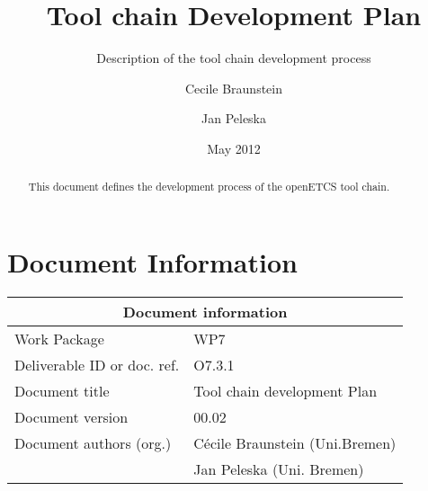 \documentclass{openetcs_article}
\begin{document}
\frontmatter
{}




\title{Tool chain Development Plan}

\subtitle{Description of the tool chain development process}

\date{May 2012}


\author{Cecile Braunstein \and Jan Peleska}







\begin{abstract}
  This document defines the development process of the openETCS tool
  chain. 

\end{abstract}

\maketitle
\tableofcontents
\listoffiguresandtables

\newpage

\section*{Document Information}
\begin{tabular}{|p{4.4cm}|p{8.7cm}|}
\hline
\multicolumn{2}{|c|}{Document information} \\
\hline
Work Package &  WP7  \\
Deliverable ID or doc. ref. & O7.3.1\\
\hline
Document title & Tool chain development Plan \\
Document version & 00.02 \\
Document authors (org.)  & Cécile Braunstein  (Uni.Bremen)  \\
& Jan Peleska (Uni. Bremen)\\
\hline
\end{tabular}
\end{document}
